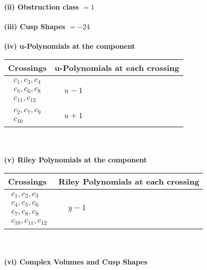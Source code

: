 \documentclass[1p]{elsarticle_modified}
\theoremstyle{definition}
\begin{document}
\flushleft \textbf{(ii) Obstruction class $= 1$}\\~\\
\flushleft \textbf{(iii) Cusp Shapes $= -24$}\\~\\
\newpage\renewcommand{\arraystretch}{1}
\flushleft \textbf{(iv) u-Polynomials at the component}\newline \\
\begin{tabular}{m{50pt}|m{274pt}}
Crossings & \hspace{64pt}u-Polynomials at each crossing \\
\hline $$\begin{aligned}c_{1},c_{3},c_{4}\\c_{5},c_{6},c_{8}\\c_{11},c_{12}\end{aligned}$$&$\begin{aligned}
&u-1
\end{aligned}$\\
\hline $$\begin{aligned}c_{2},c_{7},c_{9}\\c_{10}\end{aligned}$$&$\begin{aligned}
&u+1
\end{aligned}$\\
\hline
\end{tabular}\\~\\
\newpage\renewcommand{\arraystretch}{1}
\flushleft \textbf{(v) Riley Polynomials at the component}\newline \\
\begin{tabular}{m{50pt}|m{274pt}}
Crossings & \hspace{64pt}Riley Polynomials at each crossing \\
\hline $$\begin{aligned}c_{1},c_{2},c_{3}\\c_{4},c_{5},c_{6}\\c_{7},c_{8},c_{9}\\c_{10},c_{11},c_{12}\end{aligned}$$&$\begin{aligned}
&y-1
\end{aligned}$\\
\hline
\end{tabular}\\~\\
\newpage\flushleft \textbf{(vi) Complex Volumes and Cusp Shapes}
\end{document}

